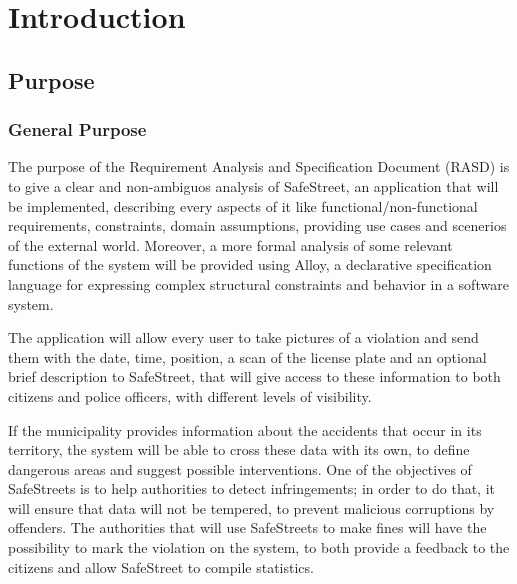 \documentclass[../RASD.tex]{subfiles}
\begin{document}
    \chapter{Introduction}\label{ch:introduction}
    \section{Purpose}\label{sec:purpose}
        \subsection{General Purpose}\label{subsec:general-purpose}
        The purpose of the Requirement Analysis and Specification Document (RASD) is to give a clear and non-ambiguos analysis of SafeStreet,
        an application that will be implemented, describing every aspects of it like functional/non-functional requirements, constraints,
        domain assumptions, providing use cases and scenerios of the external world.
        Moreover, a more formal analysis of some relevant functions of the system will be provided using Alloy,
        a declarative specification language for expressing complex structural constraints and behavior in a software system.

        The application will allow every user to take pictures of a violation and send them with the date, time, position,
        a scan of the license plate and an optional brief description to SafeStreet, that will give access to these information
        to both citizens and police officers, with different levels of visibility.

        If the municipality provides information about the accidents that occur in its territory, the system will be able to cross these data with its own,
        to define dangerous areas and suggest possible interventions.
        One of the objectives of SafeStreets is to help authorities to detect infringements;
        in order to do that, it will ensure that data will not be tempered, to prevent malicious corruptions by offenders.
        The authorities that will use SafeStreets to make fines will have the possibility to mark the violation on the system,
        to both provide a feedback to the citizens and allow SafeStreet to compile statistics.
\end{document}
